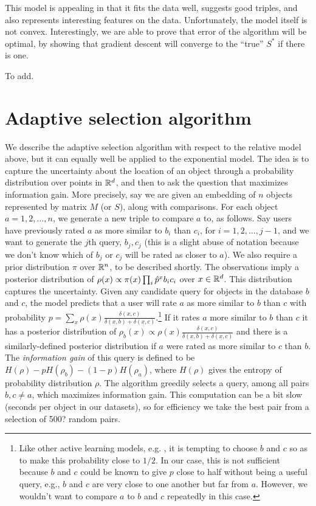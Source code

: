 \documentclass{article}
\begin{document}
This model is appealing in that it fits the data well, suggests good triples, and also represents interesting features on the data.  Unfortunately, the model itself is not convex.  Interestingly, we are able to prove that error of the algorithm will be optimal, by showing that gradient descent will converge to the ``true'' $S^*$ if there is one.
\begin{theorem}
To add.
\end{theorem}


\section{Adaptive selection algorithm}

We describe the adaptive selection algorithm with respect to the relative model above, but it can equally well be applied to the exponential model.  The idea is to capture the uncertainty about the location of an object through a probability distribution over points in $\mathbb{R}^d$, and then to ask the question that maximizes information gain.  More precisely, say we are given an embedding of $n$ objects represented by matrix $M$ (or $S$), along with comparisons.  For each object $a=1,2,\ldots,n$, we generate a new triple to compare $a$ to, as follows.  Say users have previously rated $a$ as more similar to $b_i$ than $c_i$, for $i=1,2,\ldots,j-1$, and we want to generate the $j$th query, $b_j,c_j$ (this is a slight abuse of notation because we don't know which of $b_j$ or $c_j$ will be rated as closer to $a$).  We also require a prior distribution $\pi$ over $\mathbb{R}^n$, to be described shortly.  The observations imply a posterior distribution of $\rho(x) \propto \pi(x) \prod_i \hat{p}^{x}{b_ic_i}$ over $x \in \mathbb{R}^d$.  This distribution captures the uncertainty.  Given any candidate query for objects in the database $b$ and $c$, the model predicts that a user will rate $a$ as more similar to $b$ than $c$ with probability $p=\sum_x \rho(x)\frac{\delta(x,c)}{\delta(x,b)+\delta(x,c)}$.\footnote{Like other active learning models, e.g. \cite{??}, it is tempting to choose $b$ and $c$ so as to make this probability close to $1/2$.  In our case, this is not sufficient because $b$ and $c$ could be known to give $p$ close to half without being a useful query, e.g., $b$ and $c$ are very close to one another but far from $a$.  However, we wouldn't want to compare $a$ to $b$ and $c$ repeatedly in this case.}  If it rates $a$ more similar to $b$ than $c$ it has a posterior distribution of $\rho_b(x) \propto \rho(x)\frac{\delta(x,c)}{\delta(x,b)+\delta(x,c)}$ and there is a similarly-defined posterior distribution if $a$ were rated as more similar to $c$ than $b$.  The {\em information gain} of this query is defined to be $H(\rho)-pH(\rho_b)-(1-p)H(\rho_a)$, where $H(\rho)$ gives the entropy of probability distribution $\rho$.  The algorithm greedily selects a query, among all pairs $b,c \neq a$, which maximizes information gain.  This computation can be a bit slow (seconds per object in our datasets), so for efficiency we take the best pair from a selection of 500? random pairs.  
\end{document}
